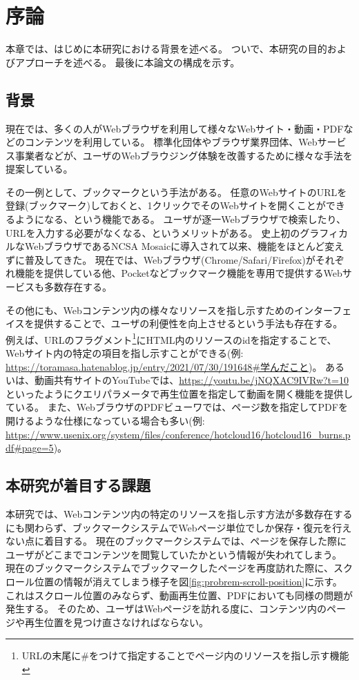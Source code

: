 \chapter{序論}
\label{chap:introduction}

本章では、はじめに本研究における背景を述べる。
ついで、本研究の目的およびアプローチを述べる。
最後に本論文の構成を示す。

\section{背景}
\label{section:background}

現在では、多くの人がWebブラウザを利用して様々なWebサイト・動画・PDFなどのコンテンツを利用している。
標準化団体やブラウザ業界団体、Webサービス事業者などが、ユーザのWebブラウジング体験を改善するために様々な手法を提案している。

その一例として、ブックマークという手法がある。
任意のWebサイトのURLを登録(ブックマーク)しておくと、1クリックでそのWebサイトを開くことができるようになる、という機能である。
ユーザが逐一Webブラウザで検索したり、URLを入力する必要がなくなる、というメリットがある。
史上初のグラフィカルなWebブラウザであるNCSA Mosaic\cite{ncsa-mosaic}に導入されて以来、機能をほとんど変えずに普及してきた。
現在では、Webブラウザ(Chrome\cite{chrome}/Safari\cite{safari}/Firefox\cite{firefox})がそれぞれ機能を提供している他、Pocket\cite{pocket}などブックマーク機能を専用で提供するWebサービスも多数存在する。

その他にも、Webコンテンツ内の様々なリソースを指し示すためのインターフェイスを提供することで、ユーザの利便性を向上させるという手法も存在する。
例えば、URLのフラグメント\footnote{URLの末尾に\#をつけて指定することでページ内のリソースを指し示す機能}にHTML内のリソースのidを指定することで、Webサイト内の特定の項目を指し示すことができる(例: \url{https://toramasa.hatenablog.jp/entry/2021/07/30/191648#学んだこと})。
あるいは、動画共有サイトのYouTube\cite{youtube}では、\url{https://youtu.be/jNQXAC9IVRw?t=10}といったようにクエリパラメータで再生位置を指定して動画を開く機能を提供している。
また、WebブラウザのPDFビューワでは、ページ数を指定してPDFを開けるような仕様になっている場合も多い(例: \url{https://www.usenix.org/system/files/conference/hotcloud16/hotcloud16_burns.pdf#page=5})。

\section{本研究が着目する課題}
本研究では、Webコンテンツ内の特定のリソースを指し示す方法が多数存在するにも関わらず、ブックマークシステムでWebページ単位でしか保存・復元を行えない点に着目する。
現在のブックマークシステムでは、ページを保存した際にユーザがどこまでコンテンツを閲覧していたかという情報が失われてしまう。
現在のブックマークシステムでブックマークしたページを再度訪れた際に、スクロール位置の情報が消えてしまう様子を図\ref{fig:probrem-scroll-position}に示す。
これはスクロール位置のみならず、動画再生位置、PDFにおいても同様の問題が発生する。
そのため、ユーザはWebページを訪れる度に、コンテンツ内のページや再生位置を見つけ直さなければならない。

